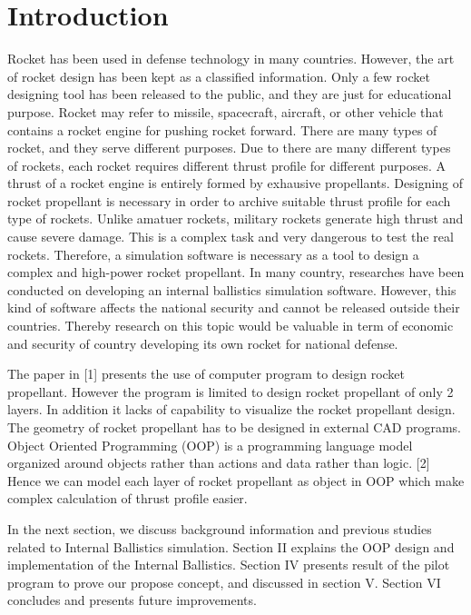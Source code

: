 \documentclass[conference]{IEEEtran}
\begin{document}
\IEEEpeerreviewmaketitle



\section{Introduction}

Rocket has been used in defense technology in many countries. However, the art of rocket design has been kept as a classified information. Only a few rocket designing tool has been released to the public, and they are just for educational purpose. Rocket may refer to missile, spacecraft, aircraft, or other vehicle that contains a rocket engine for pushing rocket forward. There are many types of rocket, and they serve different purposes. Due to there are many different types of rockets, each rocket requires different thrust profile for different purposes. A thrust of a rocket engine is entirely formed by exhausive propellants. Designing of rocket propellant is necessary in order to archive suitable thrust profile for each type of rockets. Unlike amatuer rockets, military rockets generate high thrust and cause severe damage. This is a complex task and very dangerous to test the real rockets. Therefore, a simulation software is necessary as a tool to design a complex and high-power rocket propellant. In many country, researches have been conducted on developing an internal ballistics simulation software. However, this kind of software affects the national security and cannot be released outside their countries. Thereby research on this topic would be valuable in term of economic and security of country developing its own rocket for national defense.

The paper in [1] presents the use of computer program to design rocket propellant. However the program is limited to design rocket propellant of only 2 layers. In addition it lacks of capability to visualize the rocket propellant design. The geometry of rocket propellant has to be designed in external CAD programs. Object Oriented Programming (OOP) is a programming language model organized around objects rather than actions and data rather than logic. [2] Hence we can model each layer of rocket propellant as object in OOP which make complex calculation of thrust profile easier.

In the next section, we discuss background information and previous studies related to Internal Ballistics simulation. Section II explains the OOP design and implementation of the Internal Ballistics. Section IV presents result of the pilot program to prove our propose concept, and discussed in section V. Section VI concludes and presents future improvements.
\end{document}
